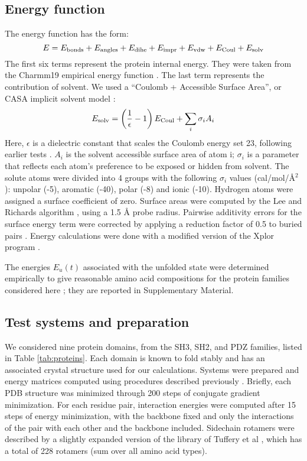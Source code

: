 \subsection{Energy function}
The energy function has the form:
\begin{equation} \label{eq:energy}
E = E_{\rm bonds} + E_{\rm angles} + E_{\rm dihe} + E_{\rm impr} + E_{\rm vdw} + E_{\rm Coul} + E_{\rm solv} 
\end{equation}
The first six terms represent the protein internal energy. They were taken from the Charmm19 empirical energy
function \cite{Charmm}. The last term represents the contribution of solvent. We used a ``Coulomb + Accessible
Surface Area'', or CASA implicit solvent model \cite{Lopes07,Schmidt08b}:
\begin{equation} \label{eq:casa}
E_{\rm solv} = \left( \frac{1}{\epsilon} -1 \right) E_{\rm Coul} + \sum_i \sigma_i A_i
\end{equation}
Here, $\epsilon$ is a dielectric constant that scales the Coulomb energy set 23, following earlier tests
\cite{Schmidt08b}. $A_i$ is the solvent accessible surface area of atom i; $\sigma_i$ is a parameter that reflects
each atom's preference to be exposed or hidden from solvent. The solute atoms were divided into 4 groups with
the following $\sigma_i$ values (cal/mol/\AA$^2$): unpolar (-5), aromatic (-40), polar (-8) and ionic (-10).
Hydrogen atoms were assigned a surface coefficient of zero. Surface areas were computed by the Lee and Richards
algorithm \cite{Lee71}, using a 1.5 {\AA} probe radius. Pairwise additivity errors for the surface energy term
were corrected by applying a reduction factor of 0.5 to buried pairs \cite{Street98,Lopes07}. Energy calculations
were done with a modified version of the Xplor program \cite{Xplor,Simonson13b}.

The energies $E_u(t)$ associated with the unfolded state were determined empirically to give reasonable amino
acid compositions for the protein families considered here \cite{Schmidt08}; they are reported in Supplementary
Material.

\subsection{Test systems and preparation}
We considered nine protein domains, from the SH3, SH2, and PDZ families, listed in Table \ref{tab:proteins}.
Each domain is known to fold stably and has an associated crystal structure used for our calculations. Systems
were prepared and energy matrices computed using procedures described previously \cite{Schmidt09,Schmidt10}.
Briefly, each PDB structure was minimized through 200 steps of conjugate gradient minimization. For each residue
pair, interaction energies were computed after 15 steps of energy minimization, with the backbone fixed and
only the interactions of the pair with each other and the backbone included. Sidechain rotamers were described
by a slightly expanded version of the library of Tuffery et al \cite{Tuffery91}, which has a total of 228 rotamers
(sum over all amino acid types).


